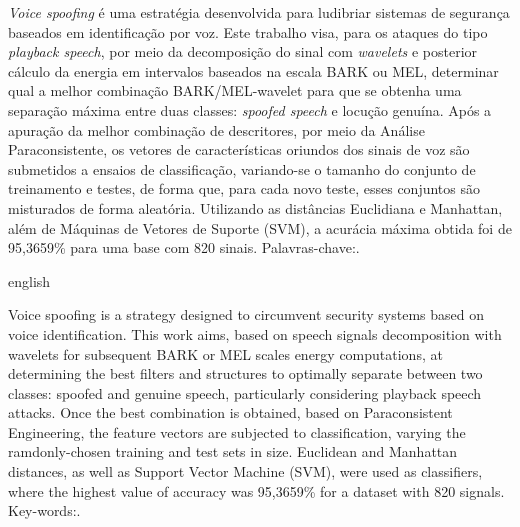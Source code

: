 \begin{resumo}
	\par \textit{Voice spoofing} é uma estratégia desenvolvida para ludibriar sistemas de segurança baseados em identificação por voz. Este trabalho visa, para os ataques do tipo \textit{playback speech}, por meio da decomposição do sinal com \textit{wavelets} e posterior cálculo da energia em intervalos baseados na escala BARK ou MEL, determinar qual a melhor combinação BARK/MEL-wavelet para que se obtenha uma separação máxima entre duas classes: \textit{spoofed speech} e locução genuína. Após a apuração da melhor combinação de descritores, por meio da Análise Paraconsistente, os vetores de características oriundos dos sinais de voz são submetidos a ensaios de classificação, variando-se o tamanho do conjunto de treinamento e testes, de forma que, para cada novo teste, esses conjuntos são misturados de forma aleatória. Utilizando as distâncias Euclidiana e Manhattan, além de Máquinas de Vetores de Suporte (SVM), a acurácia máxima obtida foi de 95,3659\% para uma base com 820 sinais.\newline\newline
	Palavras-chave:\ptBRkeyWords.
\end{resumo}

\begin{resumo}[Abstract]
	\begin{otherlanguage*}{english}
		\par Voice spoofing is a strategy designed to circumvent security systems based on voice identification. This work aims, based on speech signals decomposition with wavelets for subsequent BARK or MEL scales energy computations, at determining the best filters and structures to optimally separate between two classes: spoofed and genuine speech, particularly considering playback speech attacks. Once the best combination is obtained, based on Paraconsistent Engineering, the feature vectors are subjected to classification, varying the ramdonly-chosen training and test sets in size. Euclidean and Manhattan distances, as well as Support Vector Machine (SVM), were used as classifiers, where the highest value of accuracy was 95,3659\% for a dataset with 820 signals.\newline\newline
		Key-words:\enUSkeyWords .
	 \end{otherlanguage*}
\end{resumo}






